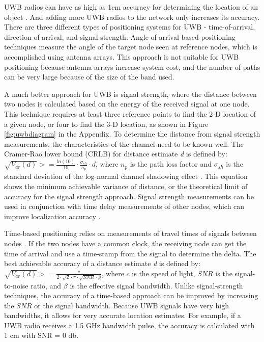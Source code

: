 \documentclass{article}
\begin{document}
UWB radios can have as high as 1cm accuracy for determining the location of an object \autocite{localization}. And adding more UWB radios to the network only increases its accuracy. There are three different types of positioning systems for UWB - time-of-arrival, direction-of-arrival, and signal-strength. Angle-of-arrival based positioning techniques measure the angle of the target node seen at reference nodes, which is accomplished using antenna arrays. This approach is not suitable for UWB positioning because antenna arrays increase system cost, and the number of paths can be very large because of the size of the band used.

A much better approach for UWB is signal strength, where the distance between two nodes is calculated based on the energy of the received signal at one node. This technique requires at least three reference points to find the 2-D location of a given node, or four to find the 3-D location, as shown in Figure \ref{fig:uwbdiagram} in the Appendix. To determine the distance from signal strength measurements, the characteristics of the channel need to be known well. The Cramer-Rao lower bound (CRLB) for distance estimate \textit{d} is defined by: $ \sqrt{V_{ar}(d)} >= \frac{ln(10)}{10} \cdot \frac{\sigma _{sh}}{n _{p}} \cdot d $, where $n _{p}$ is the path loss factor and $\sigma _{sh}$ is the standard deviation of the log-normal channel shadowing effect \autocite{localization}. This equation shows the minimum achievable variance of distance, or the theoretical limit of accuracy for the signal strength approach. Signal strength measurements can be used in conjunction with time delay measurements of other nodes, which can improve localization accuracy \autocite{uwbindoorpositioning}.

Time-based positioning relies on measurements of travel times of signals between nodes \autocite{localization}. If the two nodes have a common clock, the receiving node can get the time of arrival and use a time-stamp from the signal to determine the delta. The best achievable accuracy of a distance estimate \textit{d} is defined by: $ \sqrt{V_{ar} (d)} >= \frac{c}{2 \cdot \sqrt{2} \cdot \pi \cdot \sqrt{SNR} \cdot \beta} $, where $c$ is the speed of light, $SNR$ is the signal-to-noise ratio, and $\beta$ is the effective signal bandwidth. Unlike signal-strength techniques, the accuracy of a time-based approach can be improved by increasing the $SNR$ or the signal bandwidth. Because UWB signals have very high bandwidths, it allows for very accurate location estimates. For example, if a UWB radio receives a 1.5 GHz bandwidth pulse, the accuracy is calculated with 1 cm with SNR = 0 db.
\end{document}
